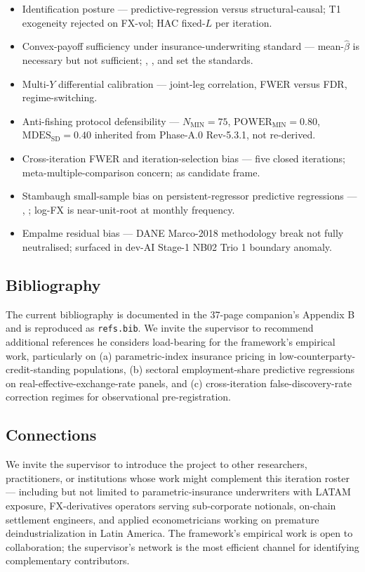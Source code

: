 \begin{itemize}
  \item Identification posture --- predictive-regression versus structural-causal; T1 exogeneity rejected on FX-vol; HAC fixed-\(L\) per iteration.
  \item Convex-payoff sufficiency under insurance-underwriting standard --- mean-\(\hat{\beta}\) is necessary but not sufficient; \citet{carter_etal_2017}, \citet{mahul_stutley_2010}, and \citet{clarke_2016} set the standards.
  \item Multi-\(Y\) differential calibration --- joint-leg correlation, FWER versus FDR, regime-switching.
  \item Anti-fishing protocol defensibility --- \(N_{\mathrm{MIN}}=75\), \(\mathrm{POWER}_{\mathrm{MIN}}=0.80\), \(\mathrm{MDES}_{\mathrm{SD}}=0.40\) inherited from Phase-A.0 Rev-5.3.1, not re-derived.
  \item Cross-iteration FWER and iteration-selection bias --- five closed iterations; meta-multiple-comparison concern; \citet{heckman_1979} as candidate frame.
  \item Stambaugh small-sample bias on persistent-regressor predictive regressions --- \citet{stambaugh1999}, \citet{phillips2014}; log-FX is near-unit-root at monthly frequency.
  \item Empalme residual bias --- DANE Marco-2018 methodology break not fully neutralised; surfaced in dev-AI Stage-1 NB02 Trio 1 boundary anomaly.
\end{itemize}

\subsection{Bibliography}\label{sec:4-bib}

The current bibliography is documented in the 37-page companion's Appendix B and is reproduced as \texttt{refs.bib}. We invite the supervisor to recommend additional references he considers load-bearing for the framework's empirical work, particularly on (a) parametric-index insurance pricing in low-counterparty-credit-standing populations, (b) sectoral employment-share predictive regressions on real-effective-exchange-rate panels, and (c) cross-iteration false-discovery-rate correction regimes for observational pre-registration.

\subsection{Connections}\label{sec:4-connections}

We invite the supervisor to introduce the project to other researchers, practitioners, or institutions whose work might complement this iteration roster --- including but not limited to parametric-insurance underwriters with LATAM exposure, FX-derivatives operators serving sub-corporate notionals, on-chain settlement engineers, and applied econometricians working on premature deindustrialization in Latin America. The framework's empirical work is open to collaboration; the supervisor's network is the most efficient channel for identifying complementary contributors.




